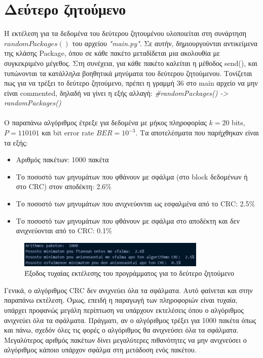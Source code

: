 \documentclass[12pt,a4paper]{article}
\begin{document}
\section{Δεύτερο ζητούμενο}   %
Η εκτέλεση για τα δεδομένα του δεύτερου ζητουμένου υλοποιείται στη συνάρτηση\\ $randomPackages()$ του αρχείου \textit{"main.py"}. Σε αυτήν, δημιουργούνται αντικείμενα της κλάσης Package, όπου σε κάθε πακέτο μεταδίδεται μια ακολουθία με συγκεκριμένο μέγεθος. Στη συνέχεια, για κάθε πακέτο καλείται η μέθοδος send(), και τυπώνονται τα κατάλληλα βοηθητικά μηνύματα του δεύτερου ζητούμενου. Τονίζεται πως για να τρέξει το δεύτερο ζητούμενο, πρέπει η γραμμή 36 στο main αρχείο να μην είναι commented, δηλαδή να γίνει η εξής αλλαγή: \textit{\#randomPackages() -> randomPackages()}\\\\
Ο παραπάνω αλγόριθμος έτρεξε για δεδομένα με μήκος πληροφορίας $k=20$ bits, $P=110101$ και bit error rate $BER=10^{-3}$. Τα αποτελέσματα που παρήχθηκαν είναι τα εξής:
\begin{itemize}
  \item Αριθμός πακέτων: 1000 πακέτα
  \item Το ποσοστό των μηνυμάτων που φθάνουν με σφάλμα (στο block δεδομένων ή στο CRC) στον αποδέκτη: 2.6\%
  \item Το ποσοστό των μηνυμάτων που ανιχνεύονται ως εσφαλμένα από το CRC: 2.5\%
  \item Tο ποσοστό των μηνυμάτων που φθάνουν με σφάλμα στο αποδέκτη και δεν ανιχνεύονται από το CRC: 0.1\%
\end{itemize}
\begin{figure}[h]
    \centering
    \includegraphics[width=0.8\textwidth]{run}
    \caption{Έξοδος τυχαίας εκτέλεσης του προγράμματος για το δεύτερο ζητούμενο}
    \label{fig:run}
\end{figure}
Γενικά, ο αλγόριθμος CRC δεν ανιχνεύει όλα τα σφάλματα. Αυτό φαίνεται και στην παραπάνω εκτέλεση. Όμως, επειδή η παραγωγή των πληροφοριών είναι τυχαία, υπάρχει προφανώς μεγάλη περίπτωση να υπάρχουν εκτελέσεις όπου ο αλγόριθμος ανιχνεύει όλα τα σφάλματα. Πράγματι, αν ο αλγόριθμος τρέξει για 1000 πακέτα όπως και πάνω, σχεδόν όλες τις φορές ο αλγόριθμος θα ανιχνεύσει όλα τα σφάλματα. Μεγαλύτερος αριθμός πακέτων δίνει μεγαλύτερες πιθανότητες να μην ανιχνεύσει ο αλγόριθμος κάποιο υπάρχον σφάλμα στη μετάδοση ενός πακέτου.
\end{document}
